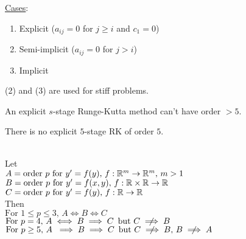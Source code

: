 \underline{Cases}:
\begin{enumerate}[label = (\arabic*)]
    \item Explicit ($a_{ij} = 0$ for $j\geq i$ and $c_1 = 0$)
    \item Semi-implicit ($a_{ij} = 0$ for $j>i$)
    \item Implicit\-\\
\end{enumerate}
\begin{remark}
  (2) and (3) are used for stiff problems.
\end{remark}

\newpage

\begin{theorem}
  An explicit $s$-stage Runge-Kutta method can't have order $> 5$.
\end{theorem}

\begin{theorem}
  There is no explicit $5$-stage RK of order $5$.
\end{theorem}

\begin{theorem}\-\\

  Let \\
  
  \-\hspace{0.5cm}$A = \text{order } p \text{ for } y'=f(y), \, f:\mathbb{R}^m \to \mathbb{R}^m, \, m>1$\\
  \-\hspace{0.5cm}$B = \text{order } p \text{ for } y'=f(x,y), \, f:\mathbb{R}\times\mathbb{R} \to \mathbb{R}$\\
  \-\hspace{0.5cm}$C = \text{order } p \text{ for } y'=f(y), \, f:\mathbb{R} \to \mathbb{R}$\\
  
  Then\\
  
  \-\hspace{0.5cm}$\text{For }1\leq p\leq3, \, A\iff B \iff C$ \\
  \-\hspace{0.5cm}$\text{For }p = 4,        \, A\iff B \implies C \, \text{ but } C \centernot\implies B$\\
  \-\hspace{0.5cm}$\text{For }p \geq 5,     \, A\hspace{0.1cm}\implies B \implies C \, \text{ but } C \centernot\implies B, \, B \centernot\implies A$\\
\end{theorem}


